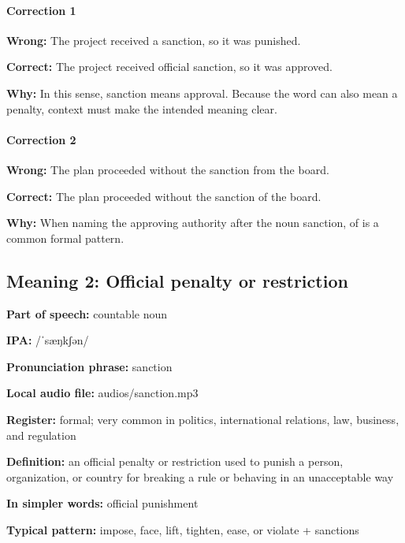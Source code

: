 \documentclass[11pt]{article}
\begin{document}
\paragraph{Correction 1}
\textbf{Wrong:} The project received a sanction, so it was punished.

\textbf{Correct:} The project received official sanction, so it was approved.

\textbf{Why:} In this sense, sanction means approval. Because the word can also mean a penalty, context must make the intended meaning clear.

\paragraph{Correction 2}
\textbf{Wrong:} The plan proceeded without the sanction from the board.

\textbf{Correct:} The plan proceeded without the sanction of the board.

\textbf{Why:} When naming the approving authority after the noun sanction, of is a common formal pattern.

\subsection{Meaning 2: Official penalty or restriction}
\textbf{Part of speech:} countable noun

\textbf{IPA:} /ˈsæŋkʃən/

\textbf{Pronunciation phrase:} sanction

\textbf{Local audio file:} audios/sanction.mp3

\textbf{Register:} formal; very common in politics, international relations, law, business, and regulation

\textbf{Definition:} an official penalty or restriction used to punish a person, organization, or country for breaking a rule or behaving in an unacceptable way

\textbf{In simpler words:} official punishment

\textbf{Typical pattern:} impose, face, lift, tighten, ease, or violate + sanctions
\end{document}

